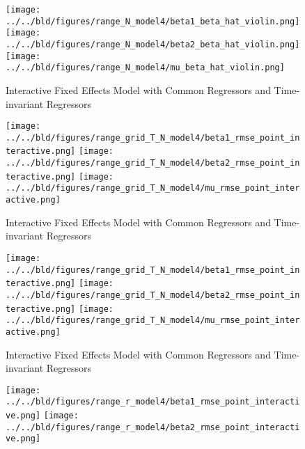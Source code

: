 \documentclass[a4paper]{article}
\begin{document}
\clearpage
\begin{figure}[h]
\centering
\texttt{[image: ../../bld/figures/range\_N\_model4/beta1\_beta\_hat\_violin.png]}
\centering
\texttt{[image: ../../bld/figures/range\_N\_model4/beta2\_beta\_hat\_violin.png]}
\centering
\texttt{[image: ../../bld/figures/range\_N\_model4/mu\_beta\_hat\_violin.png]}
\centering
\caption{\centering Interactive Fixed Effects Model with Common Regressors and Time-invariant Regressors}
\label{figure:figure11}
\end{figure}

\clearpage
\begin{figure}[ht]
\centering
\texttt{[image: ../../bld/figures/range\_grid\_T\_N\_model4/beta1\_rmse\_point\_interactive.png]}
\centering
\texttt{[image: ../../bld/figures/range\_grid\_T\_N\_model4/beta2\_rmse\_point\_interactive.png]}
\centering
\texttt{[image: ../../bld/figures/range\_grid\_T\_N\_model4/mu\_rmse\_point\_interactive.png]}
\centering
\caption{\centering Interactive Fixed Effects Model with Common Regressors and Time-invariant Regressors}
\label{figure:figure12}
\end{figure}


\clearpage
\begin{figure}[ht]
\centering
\texttt{[image: ../../bld/figures/range\_grid\_T\_N\_model4/beta1\_rmse\_point\_interactive.png]}
\centering
\texttt{[image: ../../bld/figures/range\_grid\_T\_N\_model4/beta2\_rmse\_point\_interactive.png]}
\centering
\texttt{[image: ../../bld/figures/range\_grid\_T\_N\_model4/mu\_rmse\_point\_interactive.png]}
\centering
\caption{\centering Interactive Fixed Effects Model with Common Regressors and Time-invariant Regressors}
\label{figure:figure13}
\end{figure}


\newpage

\begin{figure}[]

\centering
\texttt{[image: ../../bld/figures/range\_r\_model4/beta1\_rmse\_point\_interactive.png]}
\centering
\texttt{[image: ../../bld/figures/range\_r\_model4/beta2\_rmse\_point\_interactive.png]}
\centering
\caption{}
\label{figure:figure14}
\end{figure}
\end{document}
